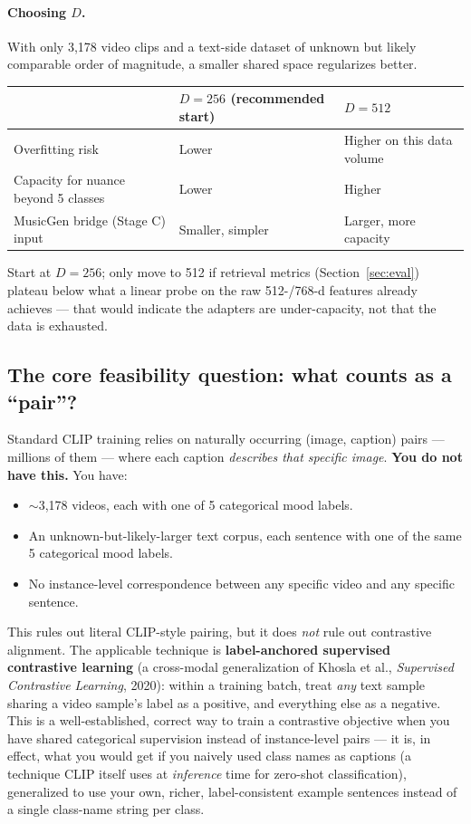 \documentclass[11pt]{article}
\begin{document}
\paragraph{Choosing $D$.} With only 3{,}178 video clips and a text-side dataset of unknown but
likely comparable order of magnitude, a smaller shared space regularizes better.

\begin{center}
\begin{tabularx}{\textwidth}{@{}X X X@{}}
\toprule
& $D=256$ (recommended start) & $D=512$ \\
\midrule
Overfitting risk & Lower & Higher on this data volume \\
Capacity for nuance beyond 5 classes & Lower & Higher \\
MusicGen bridge (Stage C) input & Smaller, simpler & Larger, more capacity \\
\bottomrule
\end{tabularx}
\end{center}
Start at $D=256$; only move to 512 if retrieval metrics (Section~\ref{sec:eval}) plateau below
what a linear probe on the raw 512-/768-d features already achieves — that would indicate the
adapters are under-capacity, not that the data is exhausted.

\subsection{The core feasibility question: what counts as a ``pair''?}
\label{sec:pairing}
Standard CLIP training relies on naturally occurring (image, caption) pairs — millions of them —
where each caption \emph{describes that specific image}. \textbf{You do not have this.} You have:

\begin{itemize}
\item $\sim$3{,}178 videos, each with one of 5 categorical mood labels.
\item An unknown-but-likely-larger text corpus, each sentence with one of the same 5 categorical
mood labels.
\item No instance-level correspondence between any specific video and any specific sentence.
\end{itemize}

This rules out literal CLIP-style pairing, but it does \emph{not} rule out contrastive alignment.
The applicable technique is \textbf{label-anchored supervised contrastive learning}
(a cross-modal generalization of Khosla et al., \emph{Supervised Contrastive Learning}, 2020):
within a training batch, treat \emph{any} text sample sharing a video sample's label as a
positive, and everything else as a negative. This is a well-established, correct way to train a
contrastive objective when you have shared categorical supervision instead of instance-level
pairs — it is, in effect, what you would get if you naively used class names as captions
(a technique CLIP itself uses at \emph{inference} time for zero-shot classification), generalized
to use your own, richer, label-consistent example sentences instead of a single class-name
string per class.
\end{document}
